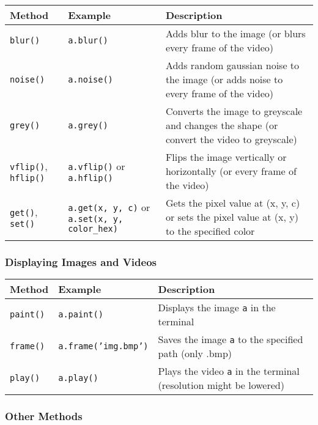 \documentclass[a4paper, 11pt]{article}
\begin{document}
          \begin{tabular}{ |p{4cm}|p{5cm}|p{7cm}|  }
            \hline
            \textbf{Method} & \textbf{Example} & \textbf{Description}\\ 
            \hline
            \texttt{blur()} & \texttt{a.blur()} & Adds blur to the image (or blurs every frame of the video) \\ \hline
            \texttt{noise()} & \texttt{a.noise()} & Adds random gaussian noise to the image (or adds noise to every frame of the video) \\ \hline
            \texttt{grey()} & \texttt{a.grey()} & Converts the image to greyscale and changes the shape (or convert the video to greyscale) \\ \hline
            \texttt{vflip()}, \texttt{hflip()} & \texttt{a.vflip()} or \texttt{a.hflip()}& Flips the image vertically or horizontally (or every frame of the video) \\ \hline
            \texttt{get()}, \texttt{set()} & \texttt{a.get(x, y, c)} or \texttt{a.set(x, y, color\_hex)} & Gets the pixel value at (x, y, c) or sets the pixel value at (x, y) to the specified color \\ \hline
           \end{tabular}

          \subsubsection{Displaying Images and Videos}
            \begin{tabular}{ |p{4cm}|p{5cm}|p{7cm}|  }
                \hline
                \textbf{Method} & \textbf{Example} & \textbf{Description}\\ 
                \hline
                \texttt{paint()} & \texttt{a.paint()} & Displays the image \texttt{a} in the terminal \\ \hline
                \texttt{frame()} & \texttt{a.frame('img.bmp')} & Saves the image \texttt{a} to the specified path (only .bmp) \\ \hline
                \texttt{play()} & \texttt{a.play()} & Plays the video \texttt{a} in the terminal (resolution might be lowered)\\ \hline
             \end{tabular}


          \subsubsection{Other Methods}
\end{document}
